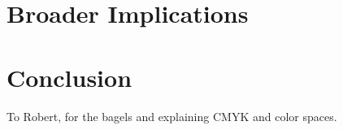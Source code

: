 \documentclass[sigconf,authordraft]{acmart}
\begin{document}
\section{Broader Implications}


\section{Conclusion}


\begin{acks}
To Robert, for the bagels and explaining CMYK and color spaces.
\end{acks}



\end{document}
